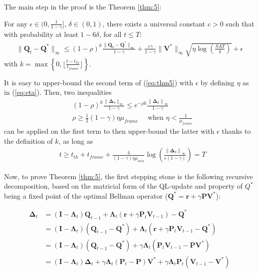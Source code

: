 The main step in the proof is the Theorem \ref{thm:5}:

\begin{thm}[Theorem 5]\label{thm:5}
  For any $\epsilon \in (0, \frac{1}{1-\gamma}]$, $\delta \in (0, 1)$, there exists a universal constant $c > 0$ such that with probability at least $1 - 6\delta$, for all $t \leq T$:
    \begin{align}
      \|\mathbf{Q}_t - \mathbf{Q}^*\|_\infty \leq (1-\rho)^k \frac{\|\mathbf{Q}_0 - \mathbf{Q}^*\|_\infty}{1-\gamma} + \frac{c \gamma}{1-\gamma}\|\mathbf{V}^*\|_\infty \sqrt{\eta \log\left( \frac{SAT}{\delta} \right)} + \epsilon \label{eq:thm5}
    \end{align}
    with $k = \max \left\{ 0, \lfloor \frac{t - t_{th}}{t_{frame}} \rfloor \right\}$.
\end{thm}

It is easy to upper-bound the second term of (\ref{eq:thm5}) with $\epsilon$ by defining $\eta$ as in (\ref{eq:eta}). Then, two inequalities
\begin{align}
  &(1-\rho)^k \frac{\|\mathbf{\Delta}_0\|_\infty }{1-\gamma} \leq e^{- \rho k}\frac{\left\| \mathbf{\Delta}_0 \right\|_\infty}{1-\gamma}\\
  &\rho \geq \frac{1}{2}(1-\gamma)\eta\mu_{frame} \quad \text{ when } \eta < \frac{1}{\mu_{frame}}
\end{align}
can be applied on the first term to then upper-bound the latter with $\epsilon$ thanks to the definition of $k$, as long as
\begin{align}
  &t \geq t_{th} + t_{frame} + \frac{4}{(1-\gamma)\eta \mu_{min}} \log\left( \frac{\left\| \mathbf{\Delta}_0 \right\|_\infty}{\epsilon(1-\gamma)} \right) = T
\end{align}

Now, to prove Theorem \ref{thm:5}, the first stepping stone is the following recursive decomposition, based on the matricial form of the QL-update and property of $Q^*$ being a fixed point of the optimal Bellman operator ($\mathbf{Q}^* = \mathbf{r} + \gamma \mathbf{P}\mathbf{V}^*$):

\begin{align}
  \mathbf{\Delta}_t &= (\mathbf{I}-\mathbf{\Lambda}_t)\mathbf{Q}_{t-1} + \mathbf{\Lambda}_t(\mathbf{r} + \gamma \mathbf{P}_t \mathbf{V}_{t-1}) - \mathbf{Q}^*\label{eq:1}\\
  &= (\mathbf{I}-\mathbf{\Lambda}_t)(\mathbf{Q}_{t-1} - \mathbf{Q}^*) + \mathbf{\Lambda}_t(\mathbf{r} + \gamma \mathbf{P}_t \mathbf{V}_{t-1} - \mathbf{Q}^*)\label{eq:2}\\
  &= (\mathbf{I}-\mathbf{\Lambda}_t)(\mathbf{Q}_{t-1} - \mathbf{Q}^*) + \gamma\mathbf{\Lambda}_t(\mathbf{P}_t \mathbf{V}_{t-1} - \mathbf{P}\mathbf{V}^*)\label{eq:3}\\
  &= (\mathbf{I}-\mathbf{\Lambda}_t)\mathbf{\Delta}_t + \gamma\mathbf{\Lambda}_t(\mathbf{P}_t - \mathbf{P}) \mathbf{V}^* + \gamma \mathbf{\Lambda}_t\mathbf{P}_t (\mathbf{V}_{t-1} - \mathbf{V}^*)\label{eq:4}
\end{align}


